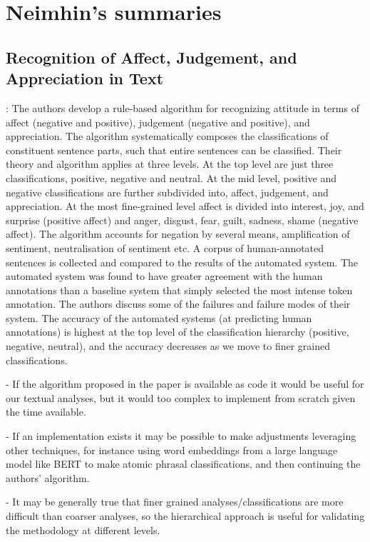 \section{Neimhin's summaries}
\subsection{Recognition of Affect, Judgement, and Appreciation in Text}
\cite{neviarouskaya-2010}: The authors develop a rule-based algorithm for recognizing attitude in terms of affect (negative and positive), judgement (negative and positive), and appreciation. The algorithm systematically composes the classifications of constituent sentence parts, such that entire sentences can be classified. Their theory and algorithm applies at three levels. At the top level are just three classifications, positive, negative and neutral. At the mid level, positive and negative classifications are further subdivided into, affect, judgement, and appreciation. At the most fine-grained level affect is divided into interest, joy, and surprise (positive affect) and anger, disgust, fear, guilt, sadness, shame (negative affect). The algorithm accounts for negation by several means, amplification of sentiment, neutralisation of sentiment etc. A corpus of human-annotated sentences is collected and compared to the results of the automated system. The automated system was found to have greater agreement with the human annotations than a baseline system that simply selected the most intense token annotation. The authors discuss some of the failures and failure modes of their system. The accuracy of the automated systems (at predicting human annotations) is highest at the top level of the classification hierarchy (positive, negative, neutral), and the accuracy decreases as we move to finer grained classifications.

- If the algorithm proposed in the paper is available as code it would be useful for our textual analyses, but it would too complex to implement from scratch given the time available.

- If an implementation exists it may be possible to make adjustments leveraging other techniques, for instance using word embeddings from a large language model like BERT to make atomic phrasal classifications, and then continuing the authors' algorithm.

- It may be generally true that finer grained analyses/classifications are more difficult than coarser analyses, so the hierarchical approach is useful for validating the methodology at different levels.


